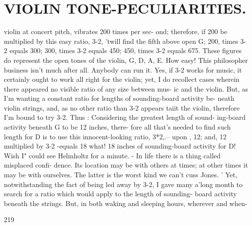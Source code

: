 \documentclass{article}
\begin{document}
\section*{VIOLIN TONE-PECULIARITIES.}
violin at concert pitch, vibrates 200 times per sec- ond; therefore, if 200 be multiplied by this easy ratio, 3-2, 'twill find the fifth above open G; 200, times 3-2 equals 300; 300, times 3-2 equals 450; 450, times 3-2 equals 675. These figures do represent the open tones of the violin, G, D, A, E. How easy! This philosopher business isn't much after all. Anybody can run it. Yes, if 3-2 works for music, it certainly ought to work all right for the violin; yet, I do recollect cases wherein there appeared no visible ratio of any size between mus- ic and the violin. But, as I'm wanting a constant ratio for lengths of sounding-board activity be- neath violin strings, and, as no other ratio than 3-2 appears taiit the violin, therefore I'm bound to try 3-2. Thus : Considering the greatest length of sound- ing-board activity beneath G to be 12 inches, there- fore all that's needed to find such length for D is to use this innocent-looking ratio, 3*2,.-- upon , 12; and, 12 multiplied by 3-2 -equals 18 what! 18 inches of sounding-board activity for D! Wish I" could see Helmholtz for a minute. - In life there is a thing called misplaced confi- dence. Its location may be with others at times; at other times it may be with ourselves. The latter is the worst kind we can't cuss Jones. ' Yet, notwithstanding the fact of being led away by 3-2, I gave many a'long month to search for a ratio which would apply to the length of sounding- board activity beneath the strings. But, in both waking and sleeping hours, wherever and when-

219
\end{document}
